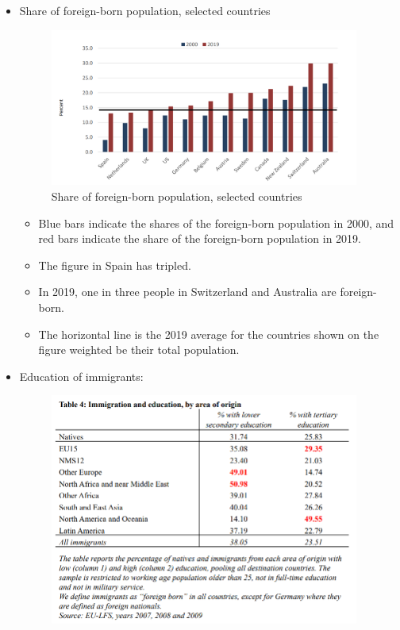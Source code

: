 \begin{itemize}
\begin{itemize}
         \end{itemize}
    \item Share of foreign-born population, selected countries
    \begin{figure}[H]
                \centering
                \includegraphics[width=4in]{images/ch11/2.png}
                \caption{Share of foreign-born population, selected countries}
            \end{figure}
         \begin{itemize}
         \item Blue bars indicate the shares of the foreign-born population in 2000, and red bars indicate the share of the foreign-born population in 2019. 
         \item The figure in Spain has tripled.
         \item In 2019, one in three people in Switzerland and Australia are foreign-born.
         \item The horizontal line is the 2019 average for the countries shown on the figure weighted be their total population.
         \end{itemize}
    \item Education of immigrants:
    \begin{figure}[H]
                \centering
                \includegraphics[width=4in]{images/ch11/6.png}

\end{figure}
\end{itemize}
